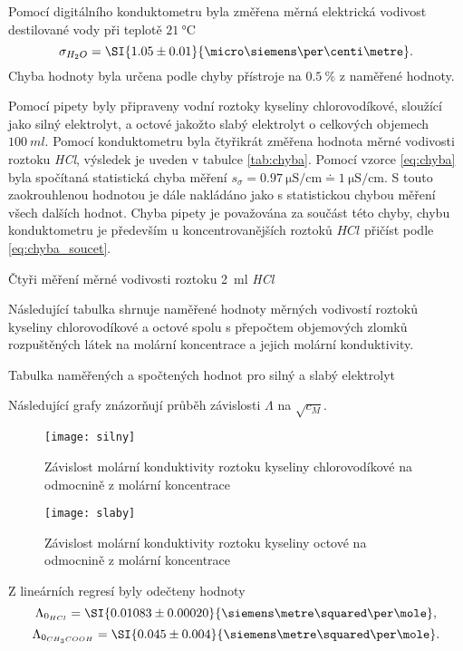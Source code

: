 \documentclass[0-protokol.tex]{subfiles}
\begin{document}
Pomocí digitálního konduktometru byla změřena měrná elektrická vodivost destilované vody při teplotě $\SI{21}{\celsius}$
$$ \sigma_{H_2O} = \SI{1.05 \pm 0.01}{\micro\siemens\per\centi\metre}.$$
Chyba hodnoty byla určena podle chyby přístroje na $\SI{0.5}{\percent}$ z naměřené hodnoty.

Pomocí pipety byly připraveny vodní roztoky kyseliny chlorovodíkové, sloužící jako silný elektrolyt, a octové jakožto slabý elektrolyt o celkových objemech $\SI{100}{ml}$. Pomocí konduktometru byla čtyřikrát změřena hodnota měrné vodivosti roztoku \textit{HCl}, výsledek je uveden v tabulce \ref{tab:chyba}. Pomocí vzorce \eqref{eq:chyba} byla spočítaná statistická chyba měření $s_\sigma = \SI{0.97}{\micro\siemens\per\centi\metre} \doteq \SI{1}{\micro\siemens\per\centi\metre}$. S touto zaokrouhlenou hodnotou je dále nakládáno jako s statistickou chybou měření všech dalších hodnot. Chyba pipety je považována za součást této chyby, chybu konduktometru je především u koncentrovanějších roztoků $HCl$ přičíst podle \eqref{eq:chyba_soucet}.

\begin{table}[H] 
\centering
\setlength{\tabcolsep}{10pt}

\caption{Čtyři měření měrné vodivosti roztoku \SI{2}{ml} \textit{HCl}}
\label{tab:chyba}
\end{table}

Následující tabulka shrnuje naměřené hodnoty měrných vodivostí roztoků kyseliny chlorovodíkové a octové spolu s přepočtem objemových zlomků rozpuštěných látek na molární koncentrace a jejich molární konduktivity.

\begin{table}[H] 
\centering
\setlength{\tabcolsep}{10pt}

\caption{Tabulka naměřených a spočtených hodnot pro silný a slabý elektrolyt}
\label{tab:koncentrace}
\end{table}

Následující grafy znázorňují průběh závislosti $\Lambda$ na $\sqrt{c_M}$.

\begin{figure}[H]
\centering
\texttt{[image: silny]}
\caption{Závislost molární konduktivity roztoku kyseliny chlorovodíkové na odmocnině z molární koncentrace}
\label{fig:silny}
\end{figure}

\begin{figure}[H]
\centering
\texttt{[image: slaby]}
\caption{Závislost molární konduktivity roztoku kyseliny octové na odmocnině z molární koncentrace}
\label{fig:slaby}
\end{figure}

Z lineárních regresí byly odečteny hodnoty 
$$ \Lambda_{0_{HCl}} = \SI{0.01083 \pm 0.00020}{\siemens\metre\squared\per\mole},$$
$$ \Lambda_{0_{CH_3COOH}} = \SI{0.045 \pm 0.004}{\siemens\metre\squared\per\mole}. $$
\end{document}
